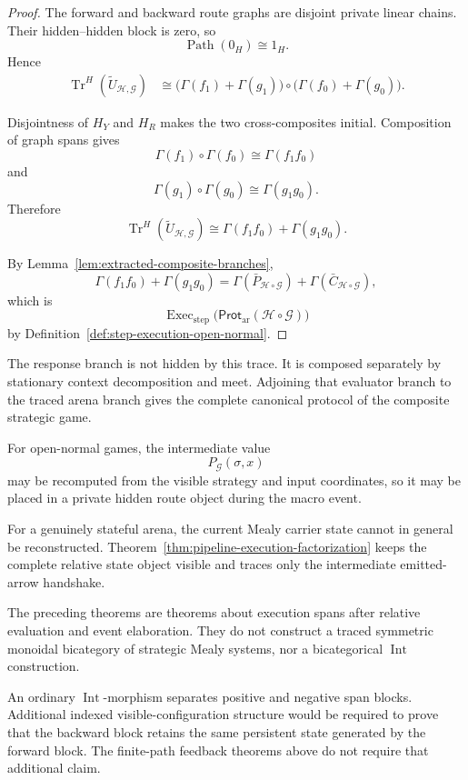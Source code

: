 \begin{proof}
The forward and backward route graphs are disjoint private linear chains. Their hidden--hidden block
is zero, so
\[
  \operatorname{Path}(0_H)\cong1_H.
\]
Hence
\[
\begin{aligned}
  \operatorname{Tr}^{H}
  (\widetilde U_{\mathcal H,\mathcal G})
  &\cong
  \bigl(
    \Gamma(f_1)+\Gamma(g_1)
  \bigr)
  \circ
  \bigl(
    \Gamma(f_0)+\Gamma(g_0)
  \bigr).
\end{aligned}
\]

Disjointness of \(H_Y\) and \(H_R\) makes the two cross-composites initial. Composition of graph
spans gives
\[
  \Gamma(f_1)\circ\Gamma(f_0)
  \cong
  \Gamma(f_1f_0)
\]
and
\[
  \Gamma(g_1)\circ\Gamma(g_0)
  \cong
  \Gamma(g_1g_0).
\]
Therefore
\[
  \operatorname{Tr}^{H}
  (\widetilde U_{\mathcal H,\mathcal G})
  \cong
  \Gamma(f_1f_0)+\Gamma(g_1g_0).
\]

By Lemma~\ref{lem:extracted-composite-branches},
\[
  \Gamma(f_1f_0)+\Gamma(g_1g_0)
  =
  \Gamma(\bar P_{\mathcal H\circ\mathcal G})
  +
  \Gamma(\bar C_{\mathcal H\circ\mathcal G}),
\]
which is
\[
  \operatorname{Exec}_{\mathrm{step}}
  \bigl(
    \mathsf{Prot}_{\mathrm{ar}}
    (\mathcal H\circ\mathcal G)
  \bigr)
\]
by Definition~\ref{def:step-execution-open-normal}.
\end{proof}

The response branch is not hidden by this trace. It is composed separately by stationary context
decomposition and meet. Adjoining that evaluator branch to the traced arena branch gives the
complete canonical protocol of the composite strategic game.

\begin{remark}
For open-normal games, the intermediate value
\[
  P_{\mathcal G}(\sigma,x)
\]
may be recomputed from the visible strategy and input coordinates, so it may be placed in a private
hidden route object during the macro event.

For a genuinely stateful arena, the current Mealy carrier state cannot in general be reconstructed.
Theorem~\ref{thm:pipeline-execution-factorization} keeps the complete relative state object visible
and traces only the intermediate emitted-arrow handshake.
\end{remark}

\begin{remark}
The preceding theorems are theorems about execution spans after relative evaluation and event
elaboration. They do not construct a traced symmetric monoidal bicategory of strategic Mealy systems,
nor a bicategorical \(\operatorname{Int}\) construction.

An ordinary \(\operatorname{Int}\)-morphism separates positive and negative span blocks. Additional
indexed visible-configuration structure would be required to prove that the backward block retains
the same persistent state generated by the forward block. The finite-path feedback theorems above do
not require that additional claim.
\end{remark}

